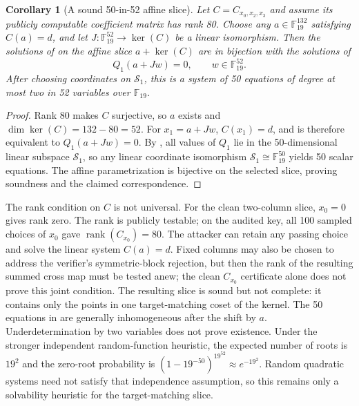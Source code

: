 \documentclass[11pt]{article}
\newtheorem{corollary}[theorem]{Corollary}
\newcommand{\F}{\mathbb F}
\newcommand{\rank}{\operatorname{rank}}
\begin{document}
\begin{corollary}[A sound 50-in-52 affine slice]\label{cor:cross-slice}
Let $C=C_{x_0,x_2,x_3}$ and assume its publicly computable coefficient matrix
has rank 80.  Choose any $a\in\F_{19}^{132}$ satisfying $C(a)=d$, and let
$J:\F_{19}^{52}\to\ker(C)$ be a linear isomorphism.  Then the solutions of
 on the affine slice $a+\ker(C)$ are in bijection with
the solutions of
\begin{equation}\label{eq:cross-50-52}
 Q_1(a+Jw)=0,
 \qquad w\in\F_{19}^{52}.
\end{equation}
After choosing coordinates on $\mathcal S_1$, this is a system of 50 equations
of degree at most two in 52 variables over $\F_{19}$.
\end{corollary}

\begin{proof}
Rank 80 makes $C$ surjective, so $a$ exists and
$\dim\ker(C)=132-80=52$.  For $x_1=a+Jw$, $C(x_1)=d$, and
 is therefore equivalent to $Q_1(a+Jw)=0$.  By
, all values of $Q_1$ lie in the 50-dimensional linear
subspace $\mathcal S_1$, so any linear coordinate isomorphism
$\mathcal S_1\cong\F_{19}^{50}$ yields 50 scalar equations.  The affine
parametrization is bijective on the selected slice, proving soundness and the
claimed correspondence.
\end{proof}

The rank condition on $C$ is not universal.  For the clean two-column slice,
$x_0=0$ gives rank zero.  The rank is publicly testable; on the audited key, all
100 sampled choices of $x_0$ gave $\rank(C_{x_0})=80$.  The attacker can retain
any passing choice and solve the linear system $C(a)=d$.  Fixed columns may also
be chosen to address the verifier's symmetric-block rejection, but then the rank
of the resulting summed cross map
must be tested anew; the clean $C_{x_0}$ certificate alone does not prove this
joint condition.  The resulting slice is sound but not complete: it contains
only the points in one target-matching coset of the kernel.  The 50 equations
in  are generally inhomogeneous after the shift by $a$.
Underdetermination by two variables does not prove existence.  Under the stronger independent random-function heuristic, the expected number of roots is $19^2$ and the zero-root probability is $(1-19^{-50})^{19^{52}}\approx e^{-19^2}$.  Random quadratic systems need not satisfy that independence assumption, so this remains only a solvability heuristic for the target-matching slice.
\end{document}
